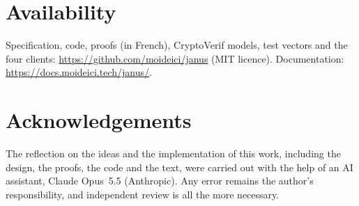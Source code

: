 \documentclass[11pt,a4paper]{article}
\theoremstyle{definition}
\theoremstyle{remark}
\begin{document}
\section*{Availability}
Specification, code, proofs (in French), CryptoVerif models, test vectors and the four clients: \url{https://github.com/moideici/janus} (MIT licence). Documentation: \url{https://docs.moideici.tech/janus/}.

\section*{Acknowledgements}
The reflection on the ideas and the implementation of this work, including the design, the proofs, the code and the text, were carried out with the help of an AI assistant, Claude Opus~5.5 (Anthropic). Any error remains the author's responsibility, and independent review is all the more necessary.
\end{document}
